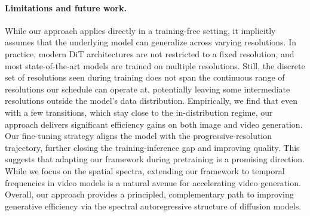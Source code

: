 \paragraph{Limitations and future work.} While our approach applies directly in a training-free setting, it implicitly assumes that the underlying model can generalize across varying resolutions.
In practice, modern DiT architectures are not restricted to a fixed resolution, and most state-of-the-art models are trained on multiple resolutions.
Still, the discrete set of resolutions seen during training does not span the continuous range of resolutions our schedule can operate at, potentially leaving some intermediate resolutions outside the model's data distribution.
Empirically, we find that even with a few transitions, which stay close to the in-distribution regime, our approach delivers significant efficiency gains on both image and video generation.
Our fine-tuning strategy aligns the model with the progressive-resolution trajectory, further closing the training-inference gap and improving quality. This suggests that adapting our framework during pretraining is a promising direction.
While we focus on the spatial spectra, extending our framework to temporal frequencies in video models is a natural avenue for accelerating video generation. Overall, our approach provides a principled, complementary path to improving generative efficiency via the spectral autoregressive structure of diffusion models.
\fi





